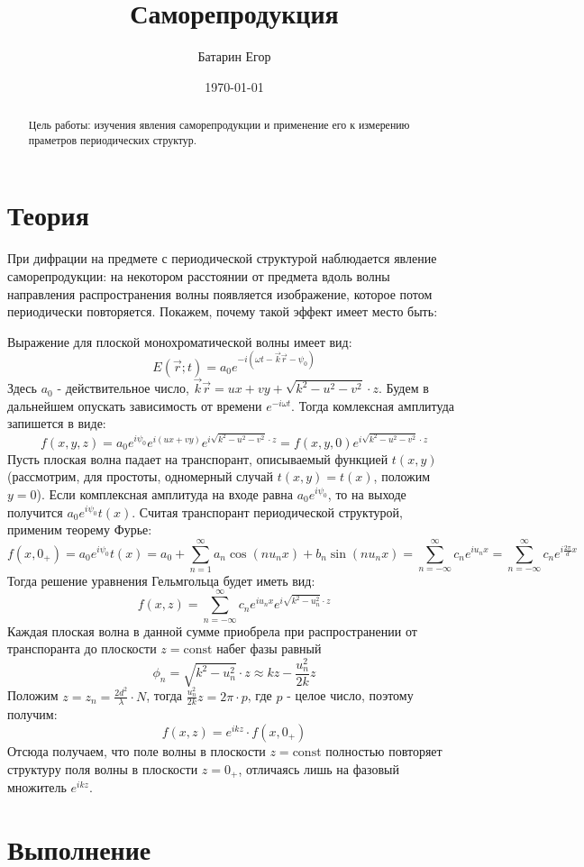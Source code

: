 \documentclass[a4paper,12pt]{article}
\author{Батарин Егор}
\title{Саморепродукция}
\date{\today}
\begin{document}
 
\maketitle
 
\begin{abstract}
   Цель работы: изучения явления саморепродукции и применение его к измерению праметров периодических структур.
\end{abstract}

\section{Теория}

При дифрации на предмете с периодической структурой наблюдается явление саморепродукции: на некотором расстоянии от предмета вдоль волны направления распространения волны появляется изображение, которое потом периодически повторяется. Покажем, почему такой эффект имеет место быть:

Выражение для плоской монохроматической волны имеет вид:
\[ E(\vec{r}; t) = a_0e^{-i(\omega t - \vec{k}\vec{r}-\psi_0)} \] 
Здесь $a_0$ - действительное число, $\vec{k}\vec{r} = ux + vy + \sqrt{k^2-u^2-v^2}\cdot z$. Будем в дальнейшем опускать зависимость от времени $e^{-i\omega t}$. Тогда комлексная амплитуда запишется в виде:
\[ f(x,y,z) = a_0e^{i\psi_0}e^{i(ux+vy)}e^{i\sqrt{k^2-u^2-v^2}\cdot z} = f(x,y,0)e^{i\sqrt{k^2-u^2-v^2}\cdot z}\]
Пусть плоская волна падает на транспорант, описываемый функцией $t(x,y)$ (рассмотрим, для простоты, одномерный случай $t(x,y) = t(x)$, положим $y=0$). Если комплексная амплитуда на входе равна $a_0e^{i\psi_0}$, то на выходе получится $a_0e^{i\psi_0}t(x)$. 
\newpage
Считая транспорант периодической структурой, применим теорему Фурье:
\[ f(x, 0_+) = a_0e^{i\psi_0}t(x) = a_0 + \sum_{n=1}^{\infty} a_n\cos{(nu_nx)} + b_n\sin{(nu_nx)}  = \sum_{n=-\infty}^{\infty} c_ne^{iu_nx} = \sum_{n=-\infty}^{\infty} c_ne^{i\frac{2\pi}{d}x} \]
Тогда решение уравнения Гельмгольца будет иметь вид:
\[f(x,z) = \sum_{n=-\infty}^{\infty} c_ne^{iu_nx}e^{i\sqrt{k^2-u^2_n}\cdot z}\]
Каждая плоская волна в данной сумме приобрела при распространении от транспоранта до плоскости $z = \textrm{const}$ набег фазы равный 
\[\phi_n = \sqrt{k^2-u_n^2}\cdot z \approx kz- \frac{u^2_n}{2k}z\]
Положим $z = z_n = \frac{2d^2}{\lambda}\cdot N$, тогда $\frac{u^2_n}{2k}z = 2\pi\cdot p$, где $p$ - целое число, поэтому получим:
\[f(x,z) = e^{ikz}\cdot f(x,0_+)\]
Отсюда получаем, что поле волны в плоскости $z = \textrm{const}$ полностью повторяет структуру поля волны в плоскости $z = 0_+$, отличаясь лишь на фазовый множитель $e^{ikz}$.
\section{Выполнение} 
\end{document}
